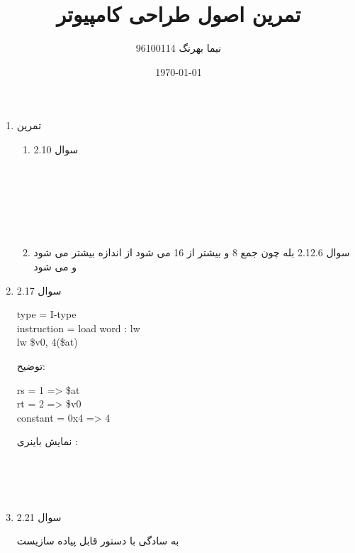 \documentclass[a4paper]{article}
\title{ تمرین اصول طراحی کامپیوتر}
\author{نیما بهرنگ 96100114}
\date{\today}
\begin{document}
\maketitle
{}

\begin{enumerate}
\item{تمرین}
\begin{enumerate}
\item{سوال 2.10}
\\
\begin{latin}
\begin{flushleft}
\\
\\
\\
\\
\\
\end{flushleft}
\end{latin}

\item{سوال 2.12.6}
  بله چون جمع 8 و
بیشتر از 16 می شود
از اندازه بیشتر می شود و 
می شود
\end{enumerate}
\item{سوال 2.17}
\begin{latin}
type = I-type\\
instruction = load word : lw\\
lw \$v0, 4(\$at)
\end{latin}
توضیح:\\
\begin{latin}
rs = 1 => \$at\\
rt = 2 => \$v0\\
constant = 0x4 => 4\\
\end{latin}

نمایش باینری : \\
\begin{flushleft}
\\
\\
\\
\end{flushleft}

\item{سوال 2.21}

به سادگی با دستور
قابل پیاده سازیست

\setLR
{}
\setRL


\end{enumerate}
\end{document}
